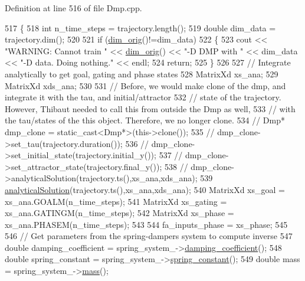 Definition at line 516 of file Dmp.\+cpp.


\begin{DoxyCode}
517 \{
518   \textcolor{keywordtype}{int} n\_time\_steps = trajectory.length();
519   \textcolor{keywordtype}{double} dim\_data = trajectory.dim();
520   
521   \textcolor{keywordflow}{if} (\hyperlink{group__DynamicalSystems_ga93d7cbbf2e471b00f124e41706405a05}{dim\_orig}()!=dim\_data)
522   \{
523     cout << \textcolor{stringliteral}{"WARNING: Cannot train "} << \hyperlink{group__DynamicalSystems_ga93d7cbbf2e471b00f124e41706405a05}{dim\_orig}() << \textcolor{stringliteral}{"-D DMP with "} << dim\_data << \textcolor{stringliteral}{"-D data. Doing
       nothing."} << endl;
524     \textcolor{keywordflow}{return};
525   \}
526   
527   \textcolor{comment}{// Integrate analytically to get goal, gating and phase states}
528   MatrixXd xs\_ana;
529   MatrixXd xds\_ana;
530   
531   \textcolor{comment}{// Before, we would make clone of the dmp, and integrate it with the tau, and initial/attractor}
532   \textcolor{comment}{// state of the trajectory. However, Thibaut needed to call this from outside the Dmp as well,}
533   \textcolor{comment}{// with the tau/states of the this object. Therefore, we no longer clone. }
534   \textcolor{comment}{// Dmp* dmp\_clone = static\_cast<Dmp*>(this->clone());}
535   \textcolor{comment}{// dmp\_clone->set\_tau(trajectory.duration());}
536   \textcolor{comment}{// dmp\_clone->set\_initial\_state(trajectory.initial\_y());}
537   \textcolor{comment}{// dmp\_clone->set\_attractor\_state(trajectory.final\_y());}
538   \textcolor{comment}{// dmp\_clone->analyticalSolution(trajectory.ts(),xs\_ana,xds\_ana);}
539   \hyperlink{classDmpBbo_1_1Dmp_ad62585b1e0bab2b9743782e15e01d694}{analyticalSolution}(trajectory.ts(),xs\_ana,xds\_ana);
540   MatrixXd xs\_goal   = xs\_ana.GOALM(n\_time\_steps);
541   MatrixXd xs\_gating = xs\_ana.GATINGM(n\_time\_steps);
542   MatrixXd xs\_phase  = xs\_ana.PHASEM(n\_time\_steps);
543   
544   fa\_inputs\_phase = xs\_phase;
545   
546   \textcolor{comment}{// Get parameters from the spring-dampers system to compute inverse}
547   \textcolor{keywordtype}{double} damping\_coefficient = spring\_system\_->\hyperlink{classDmpBbo_1_1SpringDamperSystem_a1e0acb1d6298104e74f81f53768f5bf1}{damping\_coefficient}();
548   \textcolor{keywordtype}{double} spring\_constant     = spring\_system\_->\hyperlink{classDmpBbo_1_1SpringDamperSystem_a4afd1caf44ce68f2747d8fa8a1388b0a}{spring\_constant}();
549   \textcolor{keywordtype}{double} mass                = spring\_system\_->\hyperlink{classDmpBbo_1_1SpringDamperSystem_a387fcfdb067c6de3be9bfd61b868b839}{mass}();

\end{DoxyCode}
